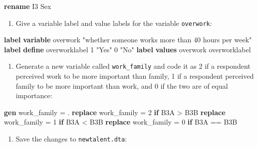 \documentclass[
]{book}
\newenvironment{Shaded}{\begin{snugshade}}{\end{snugshade}}
\newcommand{\KeywordTok}[1]{\textcolor[rgb]{0.13,0.29,0.53}{\textbf{#1}}}
\newcommand{\NormalTok}[1]{#1}
\newcommand{\StringTok}[1]{\textcolor[rgb]{0.31,0.60,0.02}{#1}}
\providecommand{\tightlist}{%
  \setlength{\itemsep}{0pt}\setlength{\parskip}{0pt}}
\begin{document}
\begin{Shaded}
\begin{Highlighting}[]
\KeywordTok{rename}\NormalTok{ I3 Sex}
\end{Highlighting}
\end{Shaded}

\begin{enumerate}
\def\labelenumi{\arabic{enumi}.}
\setcounter{enumi}{5}
\tightlist
\item
  Give a variable label and value labels for the variable \texttt{overwork}:
\end{enumerate}

\begin{Shaded}
\begin{Highlighting}[]
\KeywordTok{label} \KeywordTok{variable}\NormalTok{ overwork }\StringTok{"whether someone works more than 40 hours per week"}
\KeywordTok{label} \KeywordTok{define}\NormalTok{ overworklabel 1 }\StringTok{"Yes"}\NormalTok{ 0 }\StringTok{"No"}
\KeywordTok{label} \KeywordTok{values}\NormalTok{ overwork overworklabel}
\end{Highlighting}
\end{Shaded}

\begin{enumerate}
\def\labelenumi{\arabic{enumi}.}
\setcounter{enumi}{6}
\tightlist
\item
  Generate a new variable called \texttt{work\_family} and code it as 2 if a respondent perceived work to be more important than family, 1 if a respondent perceived family to be more important than work, and 0 if the two are of equal importance:
\end{enumerate}

\begin{Shaded}
\begin{Highlighting}[]
\KeywordTok{gen}\NormalTok{ work\_family = .}
\KeywordTok{replace}\NormalTok{ work\_family = 2 }\KeywordTok{if}\NormalTok{ B3A \textgreater{} B3B}
\KeywordTok{replace}\NormalTok{ work\_family = 1 }\KeywordTok{if}\NormalTok{ B3A \textless{} B3B}
\KeywordTok{replace}\NormalTok{ work\_family = 0 }\KeywordTok{if}\NormalTok{ B3A == B3B}
\end{Highlighting}
\end{Shaded}

\begin{enumerate}
\def\labelenumi{\arabic{enumi}.}
\setcounter{enumi}{7}
\tightlist
\item
  Save the changes to \texttt{newtalent.dta}:
\end{enumerate}
\end{document}
